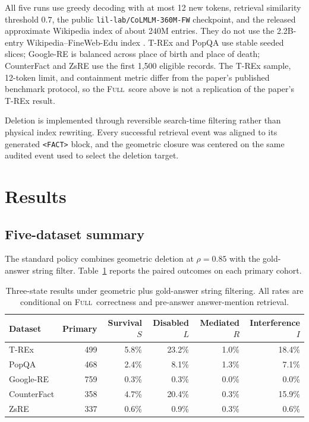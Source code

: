 \documentclass[11pt]{article}
\newcommand{\FULL}{\textsc{Full}}
\newcommand{\pct}[1]{#1\%}
\begin{document}
All five runs use greedy decoding with at most 12 new tokens, retrieval
similarity threshold \(0.7\), the public
\texttt{lil-lab/CoLMLM-360M-FW} checkpoint, and the released approximate
Wikipedia index of about 240M entries. They do not use the 2.2B-entry
Wikipedia--FineWeb-Edu index \cite{feldman2026colmlm}. T-REx and PopQA use
stable seeded slices; Google-RE is balanced across place of birth and place
of death; CounterFact and ZsRE use the first 1,500 eligible records. The
T-REx sample, 12-token limit, and containment metric differ from the
paper's published benchmark protocol, so the \FULL\ score above is not a
replication of the paper's T-REx result.

Deletion is implemented through reversible search-time filtering rather than
physical index rewriting. Every successful retrieval event was aligned to its
generated \texttt{<FACT>} block, and the geometric closure was centered on the
same audited event used to select the deletion target.

\section{Results}

\subsection{Five-dataset summary}

The standard policy combines geometric deletion at \(\rho=0.85\) with the
gold-answer string filter. Table~\ref{tab:datasets} reports the paired outcomes
on each primary cohort.

\begin{table}[H]
\centering
\caption{Three-state results under geometric plus gold-answer
string filtering. All rates are conditional on \FULL\ correctness and
pre-answer answer-mention retrieval.}
\label{tab:datasets}
\small
\begin{tabular}{lrrrrr}
\toprule
Dataset & Primary & Survival \(S\) & Disabled \(L\) & Mediated \(R\) &
Interference \(I\) \\
\midrule
T-REx & 499 & \pct{5.8} & \pct{23.2} & \pct{1.0} & \pct{18.4} \\
PopQA & 468 & \pct{2.4} & \pct{8.1} & \pct{1.3} & \pct{7.1} \\
Google-RE & 759 & \pct{0.3} & \pct{0.3} & \pct{0.0} & \pct{0.0} \\
CounterFact & 358 & \pct{4.7} & \pct{20.4} & \pct{0.3} & \pct{15.9} \\
ZsRE & 337 & \pct{0.6} & \pct{0.9} & \pct{0.3} & \pct{0.6} \\
\bottomrule
\end{tabular}
\end{table}
\end{document}
